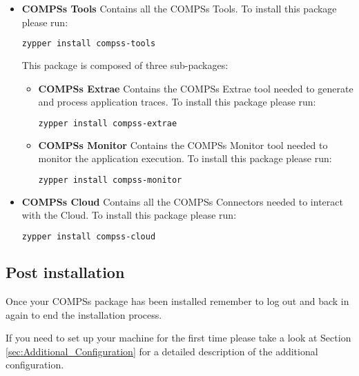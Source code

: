\begin{itemize}
 \item \textbf{COMPSs Tools} \newline
       Contains all the COMPSs Tools.
       \newline
       To install this package please run:
       \begin{lstlisting}[language=bash]
	  zypper install compss-tools
       \end{lstlisting}
       This package is composed of three sub-packages:
       \begin{itemize}
        \item \textbf{COMPSs Extrae} \newline
	      Contains the COMPSs Extrae tool needed to generate and process application traces.
	      \newline
	      To install this package please run:
	      \begin{lstlisting}[language=bash]
		  zypper install compss-extrae
	      \end{lstlisting}
        \item \textbf{COMPSs Monitor} \newline
              Contains the COMPSs Monitor tool needed to monitor the application execution. 
              \newline
	      To install this package please run:
	      \begin{lstlisting}[language=bash]
		  zypper install compss-monitor
	      \end{lstlisting}
       \end{itemize}

 \item \textbf{COMPSs Cloud} \newline
       Contains all the COMPSs Connectors needed to interact with the Cloud.
       \newline
       To install this package please run:
       \begin{lstlisting}[language=bash]
	  zypper install compss-cloud
       \end{lstlisting}
\end{itemize} 

\subsection{Post installation}
Once your COMPSs package has been installed remember to log out and back in again to end the installation process.

If you need to set up your machine for the first time please take a look at Section \ref{sec:Additional_Configuration} for a 
detailed description of the additional configuration. 
